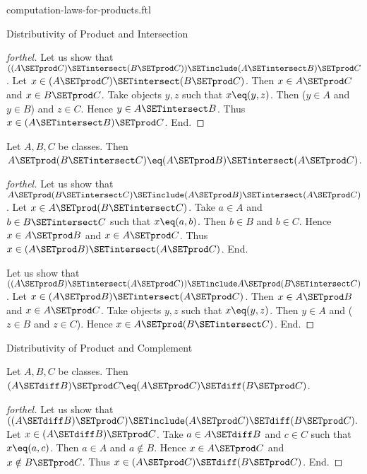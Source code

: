 \documentclass{naproche-library}
\begin{document}
\begin{smodule}[title=Computation Laws for Cartesian Products]{computation-laws-for-products.ftl}
\begin{sfragment}{Distributivity of Product and Intersection}
\begin{proof}[forthel]
    Let us show that $((A \SETprod C) \SETintersect (B \SETprod C)) \SETinclude (A \SETintersect B) \SETprod C$. %
      Let $x \in (A \SETprod C) \SETintersect (B \SETprod C)$.
      Then $x \in A \SETprod C$ and $x \in B \SETprod C$.
      Take objects $y, z$ such that $x \eq (y, z)$.
      Then ($y \in A$ and $y \in B$) and $z \in C$.
      Hence $y \in A \SETintersect B$.
      Thus $x \in (A \SETintersect B) \SETprod C$.
    End.
  \end{proof}

  \begin{proposition}[forthel,id=FOUNDATIONS_05_954964241285120]
    Let $A, B, C$ be classes.
    Then $A \SETprod (B \SETintersect C) \eq (A \SETprod B) \SETintersect (A \SETprod C)$.
  \end{proposition}
  \begin{proof}[forthel]
    Let us show that $A \SETprod (B \SETintersect C) \SETinclude (A \SETprod B) \SETintersect (A \SETprod C)$.
      Let $x \in A \SETprod (B \SETintersect C)$.
      Take $a \in A$ and $b \in B \SETintersect C$ such that $x \eq (a, b)$.
      Then $b \in B$ and $b \in C$.
      Hence $x \in A \SETprod B$ and $x \in A \SETprod C$.
      Thus $x \in (A \SETprod B) \SETintersect (A \SETprod C)$.
    End.

    Let us show that $((A \SETprod B) \SETintersect (A \SETprod C)) \SETinclude A \SETprod (B \SETintersect C)$. %
      Let $x \in (A \SETprod B) \SETintersect (A \SETprod C)$.
      Then $x \in A \SETprod B$ and $x \in A \SETprod C$.
      Take objects $y, z$ such that $x \eq (y, z)$.
      Then $y \in A$ and ($z \in B$ and $z \in C$).
      Hence $x \in A \SETprod (B \SETintersect C)$.
    End.
  \end{proof}
\end{sfragment}

\begin{sfragment}{Distributivity of Product and Complement}
  \begin{proposition}[forthel,id=FOUNDATIONS_05_6495329908162560]
    Let $A, B, C$ be classes.
    Then $(A \SETdiff B) \SETprod C \eq (A \SETprod C) \SETdiff (B \SETprod C)$.
  \end{proposition}
  \begin{proof}[forthel]
    Let us show that $((A \SETdiff B) \SETprod C) \SETinclude (A \SETprod C) \SETdiff (B \SETprod C).$ %
      Let $x \in (A \SETdiff B) \SETprod C$.
      Take $a \in A \SETdiff B$ and $c \in C$ such that $x \eq (a, c)$.
      Then $a \in A$ and $a \notin B$.
      Hence $x \in A \SETprod C$ and $x \notin B \SETprod C$.
      Thus $x \in (A \SETprod C) \SETdiff (B \SETprod C)$.
    End.


\end{proof}
\end{sfragment}
\end{smodule}
\end{document}

